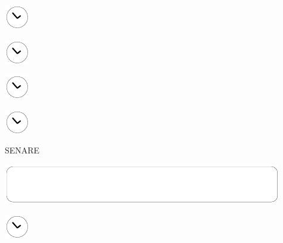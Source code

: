 \documentclass[11pt,titlepage]{article}
\begin{document}
\vspace{10,5mm}

\noindent
\hspace{1mm}\includegraphics[]{clockface.pdf}

\vspace{10,5mm}

\noindent
\hspace{1mm}\includegraphics[]{clockface.pdf}

\vspace{10,5mm}

\noindent
\hspace{1mm}\includegraphics[]{clockface.pdf}

\vspace{10,5mm}

\noindent
\hspace{1mm}\includegraphics[]{clockface.pdf}

\pagebreak

\small
\hfill SENARE

\vspace{6mm}

\noindent
\includegraphics[]{mediumbox.pdf}

\vspace{15mm}

\noindent
\hspace{1mm}\includegraphics[]{clockface.pdf}

\vspace{10,5mm}
\end{document}
